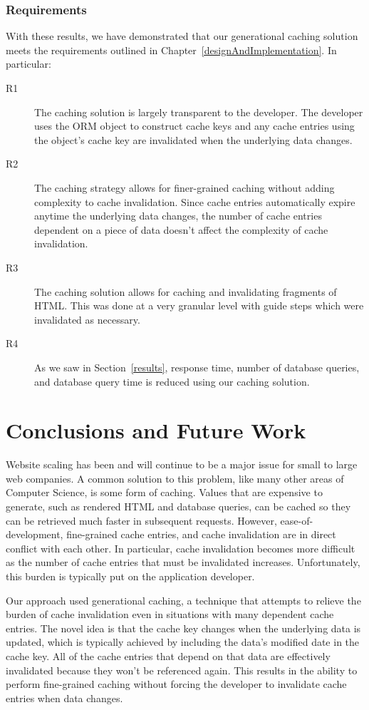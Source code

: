 \documentclass[12pt]{ucthesis}
\begin{document}
\subsection{Requirements}
With these results, we have demonstrated that our generational caching solution meets the requirements outlined in Chapter~\ref{designAndImplementation}.
In particular:

\begin{description}
   \item[R1] The caching solution is largely transparent to the developer.
             The developer uses the ORM object to construct cache keys and any cache entries using the object's cache key are invalidated when the underlying data changes.
   \item[R2] The caching strategy allows for finer-grained caching without adding complexity to cache invalidation.
             Since cache entries automatically expire anytime the underlying data changes, the number of cache entries dependent on a piece of data doesn't affect the complexity of cache invalidation.
   \item[R3] The caching solution allows for caching and invalidating fragments of HTML\@.
             This was done at a very granular level with guide steps which were invalidated as necessary.
   \item[R4] As we saw in Section~\ref{results}, response time, number of database queries, and database query time is reduced using our caching solution.
\end{description}


\chapter{Conclusions and Future Work} \label{conclusion}
Website scaling has been and will continue to be a major issue for small to large web companies.
A common solution to this problem, like many other areas of Computer Science, is some form of caching.
Values that are expensive to generate, such as rendered HTML and database queries, can be cached so they can be retrieved much faster in subsequent requests.
However, ease-of-development, fine-grained cache entries, and cache invalidation are in direct conflict with each other.
In particular, cache invalidation becomes more difficult as the number of cache entries that must be invalidated increases.
Unfortunately, this burden is typically put on the application developer.

Our approach used generational caching, a technique that attempts to relieve the burden of cache invalidation even in situations with many dependent cache entries.
The novel idea is that the cache key changes when the underlying data is updated, which is typically achieved by including the data's modified date in the cache key.
All of the cache entries that depend on that data are effectively invalidated because they won't be referenced again.
This results in the ability to perform fine-grained caching without forcing the developer to invalidate cache entries when data changes.
\end{document}
